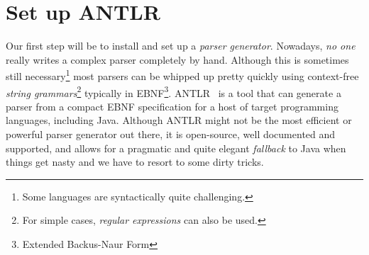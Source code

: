 \section{Set up ANTLR}

Our first step will be to install and set up a \emph{parser generator}.
Nowadays, \emph{no one} really writes a complex parser completely by hand.
Although this is sometimes still necessary\footnote{Some languages are syntactically quite challenging.} most parsers can be whipped up pretty quickly using context-free \emph{string grammars}\footnote{For simple cases, \emph{regular expressions} can also be used.} typically in EBNF\footnote{Extended Backus-Naur Form}.
ANTLR~\cite{ANTLR} is a tool that can generate a parser from a compact EBNF specification for a host of target programming languages, including Java.
Although ANTLR might not be the most efficient or powerful parser generator out there, it is open-source, well documented and supported, and allows for a pragmatic and quite elegant \emph{fallback} to Java when things get nasty and we have to resort to some dirty tricks.

